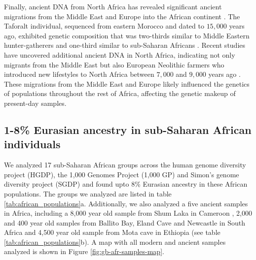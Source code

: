 Finally, ancient DNA from North Africa has revealed significant ancient migrations from the Middle East and Europe into the African continent \cite{van2018pleistocene, fregel2018ancient, simoes2023northwest}.
%
The Taforalt individual, sequenced from eastern Morocco and dated to $15{,}000$ years ago, exhibited genetic composition that was two-thirds similar to Middle Eastern hunter-gatherers and one-third similar to sub-Saharan Africans \cite{van2018pleistocene}.
%
Recent studies have uncovered additional ancient DNA in North Africa, indicating not only migrants from the Middle East but also European Neolithic farmers who introduced new lifestyles to North Africa between $7{,}000$ and $9{,}000$ years ago \cite{fregel2018ancient, simoes2023northwest}. 
%
These migrations from the Middle East and Europe likely influenced the genetics of populations throughout the rest of Africa, affecting the genetic makeup of present-day samples.


\subsection{1-8\% Eurasian ancestry in sub-Saharan African individuals}

We analyzed 17 sub-Saharan African groups across the human genome diversity project (HGDP), the 1,000 Genomes Project (1,000 GP) and Simon's genome diversity project (SGDP) and found upto 8\% Eurasian ancestry in these African populations. The groups we analyzed are listed in table \ref{tab:african_populations}a. Additionally, we also analyzed a five ancient samples in Africa, including a 8,000 year old sample from Shum Laka in Cameroon \cite{lipson2020ancient}, 2,000 and 400 year old samples from Ballito Bay, Eland Cave and Newcastle in South Africa \cite{schlebusch2017southern} and 4,500 year old sample from Mota cave in Ethiopia \cite{llorente2015ancient} (see table \ref{tab:african_populations}b). A map with all modern and ancient samples analyzed is shown in Figure \ref{fig:gb-afr-samples-map}.


